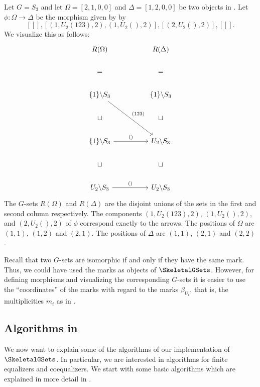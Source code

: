 \begin{exmp}\label{exmp:representation_of_morphisms}
Let $G = S_3$ and let $\Omega = [2,1,0,0]$ and $\Delta = [1,2,0,0]$ be two objects in \SkeletalGSets{}. Let $\phi\colon \Omega \to \Delta$ be the morphism given by by \[[[],[(1,U_2(123),2),(1,U_2(),2)],[(2,U_2(),2)],[]].\] We visualize this as follows:
\[
\begin{tikzcd}
R(\Omega)                   &  & R(\Delta)  \\
=                           &  & =          \\
\{1\} \backslash S_3 \arrow[rrdd, "(123)"] &  & \{1\} \backslash S_3   \\
\sqcup                      &  & \sqcup  \\
\{1\} \backslash S_3 \arrow[rr, "()"]      &  & U_2 \backslash S_3 \\
\sqcup                      &  & \sqcup  \\
U_2 \backslash S_3 \arrow[rr, "()"]    &  & U_2 \backslash S_3
\end{tikzcd}
\]
The $G$-sets $R(\Omega)$ and $R(\Delta)$ are the disjoint unions of the sets in the first and second column respectively. The components $(1,U_2(123),2)$, $(1,U_2(),2)$, and $(2,U_2(),2)$ of $\phi$ correspond exactly to the arrows. The positions of $\Omega$ are $(1,1)$, $(1,2)$ and $(2,1)$. The positions of $\Delta$ are $(1,1)$, $(2,1)$ and $(2,2)$.
\end{exmp}

\begin{rem}
Recall that two $G$-sets are isomorphic if and only if they have the same mark. Thus, we could have used the marks as objects of $\SkeletalGSets$. However, for defining morphisms and visualizing the corresponding $G$-sets it is easier to use the ``coordinates'' of the marks with regard to the marks $\beta_{U_i}$, that is, the multiplicities $m_i$ as in .
\end{rem}

\subsection{Algorithms in \SkeletalGSets{}}

We now want to explain some of the algorithms of our implementation of $\SkeletalGSets$. In particular, we are interested in algorithms for finite equalizers and coequalizers. We start with some basic algorithms which are explained in more detail in \cite{Julia}.

